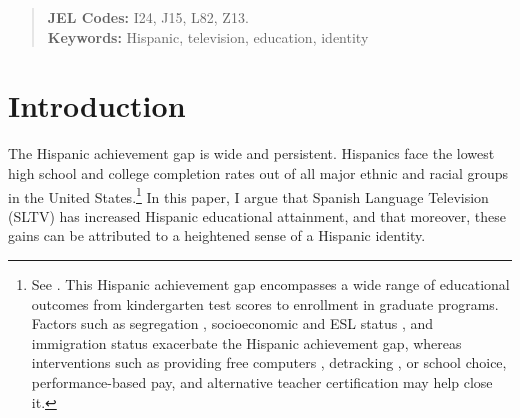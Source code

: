 \documentclass[11pt]{article}
\begin{document}
\begin{abstract}
\textbf{JEL Codes:} I24, J15, L82, Z13.\\
\textbf{Keywords:} Hispanic, television, education, identity
\end{abstract}




\newsavebox{\tablebox} \newlength{\tableboxwidth}

\setlength{\baselineskip}{22pt}

\renewcommand{\thefootnote}{\fnsymbol{footnote}}


\thispagestyle{empty}

\newpage 
\renewcommand{\thefootnote}{\arabic{footnote}}

\pagebreak 
\setcounter{page}{0}


\onehalfspacing


\newpage

\setcounter{page}{1}
\section{Introduction}


The Hispanic achievement gap is wide and persistent. Hispanics face the lowest high school and college completion rates out of all major ethnic and racial groups in the United States.\footnote{ See \cite{tienda_hispanicity_2009}. This Hispanic achievement gap encompasses a wide range of educational outcomes from kindergarten test scores to enrollment in graduate programs. Factors such as segregation \citep{cascio_cracks_2012}, socioeconomic and ESL status \citep{carpenter2006gap}, and immigration status \citep{reardon2009hispanic} exacerbate the Hispanic achievement gap, whereas interventions such as providing free computers \citep{fairlie2012academic}, detracking \citep{burris2005closing}, or school choice, performance-based pay, and alternative teacher certification \citep{ladner2010closing} may help close it.   } In this paper, I argue that Spanish Language Television (SLTV) has increased Hispanic educational attainment, and that moreover, these gains can be attributed to a heightened sense of a Hispanic identity.
\end{document}
